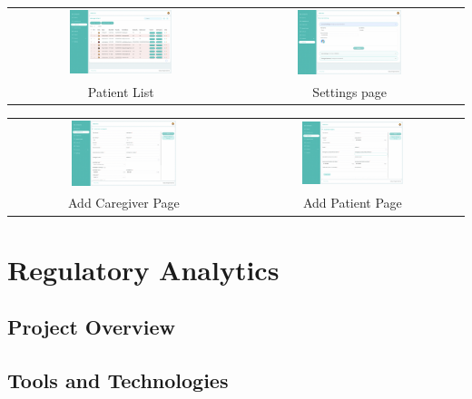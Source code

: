 \begin{center}
    \begin{tabular}{cc}
    \includegraphics[width=0.475\textwidth]{images/Chapter4/Evv/patient_list_mid.png} & \includegraphics[width=0.475\textwidth]{images/Chapter4/Evv/settings_mid.png} \\
    Patient List & Settings page \\
    \end{tabular}
\end{center}

\begin{center}
    \begin{tabular}{cc}
    \includegraphics[width=0.475\textwidth]{images/Chapter4/Evv/add_caregiver_mid.png} & \includegraphics[width=0.475\textwidth]{images/Chapter4/Evv/add_patient_mid.png} \\
    Add Caregiver Page & Add Patient Page \\
    \end{tabular}
\end{center}




\section{Regulatory Analytics}

\subsection{Project Overview}

\subsection{Tools and Technologies}
